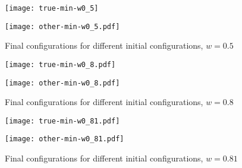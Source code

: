 \begin{figure}
\begin{minipage}[b]{0.46\linewidth}
\centering
\texttt{[image: true-min-w0\_5]}

\label{fig:Finalconfig-MultMin-w-0_5_a}

\end{minipage}
\hspace{0.5cm}
\begin{minipage}[b]{0.46\linewidth}
\centering
\texttt{[image: other-min-w0\_5.pdf]}

\label{fig:Finalconfig-MultMin-w-0_5_b}

\end{minipage}

\caption{Final configurations for different initial configurations, $w=0.5$ }
\label{fig:Finalconfig-MultMin-w-0_5}

\end{figure}

\begin{figure}
\begin{minipage}[b]{0.46\linewidth}
\centering
\texttt{[image: true-min-w0\_8.pdf]}
\label{fig:Finalconfig-MultMin-w-0_8_a}


\end{minipage}
\hspace{0.5cm}
\begin{minipage}[b]{0.46\linewidth}
\centering
\texttt{[image: other-min-w0\_8.pdf]}
\label{fig:Finalconfig-MultMin-w-0_8_b}


\end{minipage}

\caption{Final configurations for different initial configurations, $w=0.8$ }
\label{fig:Finalconfig-MultMin-w-0_8}

\end{figure}



\begin{figure}
\begin{minipage}[b]{0.46\linewidth}
\centering
\texttt{[image: true-min-w0\_81.pdf]}


\end{minipage}
\hspace{0.5cm}
\begin{minipage}[b]{0.46\linewidth}
\centering
\texttt{[image: other-min-w0\_81.pdf]}


\end{minipage}

\caption{Final configurations for different initial configurations, $w=0.81$ }
\label{fig:Finalconfig-MultMin-w-0_81}

\end{figure}




